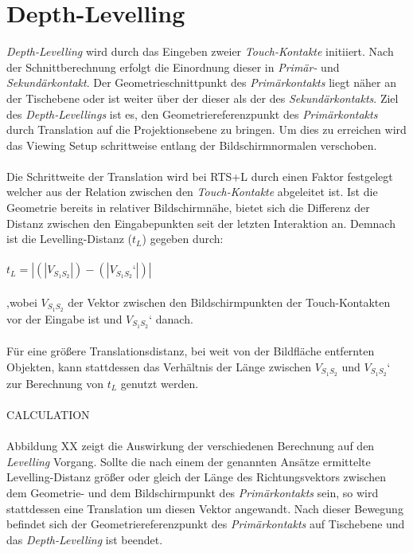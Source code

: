 \section{Depth-Levelling}
\label{sec:depth_levelling}

\emph{Depth-Levelling} wird durch das Eingeben zweier \emph{Touch-Kontakte} initiiert. Nach der Schnittberechnung erfolgt die Einordnung dieser in \emph{Primär-} und \emph{Sekundärkontakt}. Der Geometrieschnittpunkt des \emph{Primärkontakts} liegt näher an der Tischebene oder ist weiter über der dieser als der des \emph{Sekundärkontakts}. Ziel des \emph{Depth-Levellings} ist es, den Geometriereferenzpunkt des \emph{Primärkontakts} durch Translation auf die Projektionsebene zu bringen. Um dies zu erreichen wird das Viewing Setup schrittweise entlang der Bildschirmnormalen verschoben. 
\\\\
Die Schrittweite der Translation wird bei RTS+L durch einen Faktor festgelegt welcher aus der Relation zwischen den \emph{Touch-Kontakte} abgeleitet ist. Ist die Geometrie bereits in relativer Bildschirmnähe, bietet sich die Differenz der Distanz zwischen den Eingabepunkten  seit der letzten Interaktion an. Demnach ist die Levelling-Distanz ($t_L$) gegeben durch:
\\\\
$t_L = | (|V_{S_1S_2}|) - (|V_{S_1S_2}‘|) |$ 
\\\\
,wobei $V_{S_1S_2}$ der Vektor zwischen den Bildschirmpunkten der Touch-Kontakten vor der Eingabe ist und $V_{S_1S_2}‘$ danach. 
\\\\
Für eine größere Translationsdistanz, bei weit von der Bildfläche entfernten Objekten, kann stattdessen das Verhältnis der Länge zwischen $V_{S_1S_2}$ und $V_{S_1S_2}‘$ zur Berechnung von $t_L$ genutzt werden.
\\\\
CALCULATION
\\\\
Abbildung XX zeigt die Auswirkung der verschiedenen Berechnung auf den \emph{Levelling} Vorgang. Sollte die nach einem der genannten Ansätze ermittelte Levelling-Distanz größer oder gleich der Länge des Richtungsvektors zwischen dem Geometrie- und dem Bildschirmpunkt des \emph{Primärkontakts} sein, so wird stattdessen eine Translation um diesen Vektor angewandt. Nach dieser Bewegung befindet sich der Geometriereferenzpunkt des \emph{Primärkontakts} auf Tischebene und das \emph{Depth-Levelling} ist beendet.

